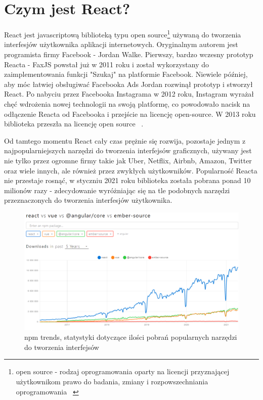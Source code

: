 \documentclass[oneside,polski,logo,indent]{amuthesis}
\begin{document}
\section{Czym jest React?}
{
React jest javascriptową biblioteką typu open source\footnote{open source - rodzaj oprogramowania oparty na licencji przyznającej użytkownikom prawo do badania, zmiany i rozpowszechniania oprogramowania ~\cite{opensourcewiki}} używaną do tworzenia interfesjów użytkownika aplikacji internetowych. Oryginalnym autorem jest programista firmy Facebook - Jordan Walke. Pierwszy, bardzo wczesny prototyp Reacta - FaxJS powstał już w 2011 roku i został wykorzystany do zaimplementowania funkcji "Szukaj" na platformie Facebook. Niewiele później, aby móc łatwiej obsługiwać Facebooka Ads Jordan rozwinął prototyp i stworzył React. Po nabyciu przez Facebooka Instagrama w 2012 roku, Instagram wyrażał chęć wdrożenia nowej technologii na swoją platformę, co powodowało nacisk na odłączenie Reacta od Facebooka i przejście na licencję open-source. W 2013 roku biblioteka przeszła na licencję open source ~\cite{reactstory}. 
\newline

Od tamtego momentu React cały czas prężnie się rozwija, pozostaje jednym z najpopularniejszych narzędzi do tworzenia interfejsów graficznych, używany jest nie tylko przez ogromne firmy takie jak Uber, Netflix, Airbnb, Amazon, Twitter oraz wiele innych, ale również przez zwykłych użytkowników. Popularność Reacta nie przestaje rosnąć, w styczniu 2021 roku biblioteka została pobrana ponad 10 milionów razy - zdecydowanie wyróżniając się na tle podobnych narzędzi przeznaczonych do tworzenia interfesjów użytkownika.

\begin{figure}
\centering
\includegraphics[width=14cm]{statystyki react vue angular.png}
\caption{npm trends, statystyki dotyczące ilości pobrań popularnych narzędzi do tworzenia interfejsów}
\label{statystyki react vue angular.png}
\end{figure}

}
\end{document}
